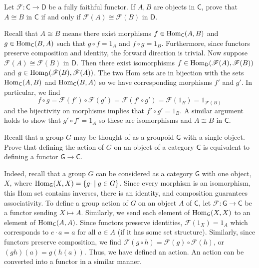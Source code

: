 \documentclass[../../master.tex]{subfiles}
\begin{document}
\begin{problem}
    Let $\mathscr{F} : \mathsf{C} \to \mathsf{D}$ be a fully faithful functor.
    If $A, B$ are objects in $\mathsf{C}$, prove that $A \cong B$ in $\mathsf{C}$ if and only if $\mathscr{F}(A) \cong \mathscr{F}(B)$ in $\mathsf{D}$.
\end{problem}

\begin{solution}
    Recall that $A \cong B$ means there exist morphisms $f \in \operatorname{Hom}_{\mathsf{C}}(A, B)$ and $g \in \operatorname{Hom}_{\mathsf{C}}(B, A)$ such that $g \circ f = 1_A$ and $f \circ g = 1_B$.
    Furthermore, since functors preserve composition and identity, the forward direction is trivial.
    Now suppose $\mathscr{F}(A) \cong \mathscr{F}(B)$ in $\mathsf{D}$.
    Then there exist isomorphisms $f \in \operatorname{Hom}_{\mathsf{D}}(\mathscr{F}(A), \mathscr{F}(B))$ and $g \in \operatorname{Hom}_{\mathsf{D}}(\mathscr{F}(B), \mathscr{F}(A))$.
    The two Hom sets are in bijection with the sets $\operatorname{Hom}_{\mathsf{C}}(A, B)$ and $\operatorname{Hom}_{\mathsf{C}}(B, A)$ so we have corresponding morphisms $f'$ and $g'$.
    In particular, we find
    \[
        f \circ g = \mathscr{F}(f') \circ \mathscr{F}(g') = \mathscr{F}(f' \circ g') = \mathscr{F}(1_B) = 1_{\mathscr{F}(B)}
    \]
    and the bijectivity on morphisms implies that $f' \circ g' = 1_B$.
    A similar argument holds to show that $g' \circ f' = 1_A$ so these are isomorphisms and $A \cong B$ in $\mathsf{C}$.
\end{solution}

\begin{problem}
    Recall that a group $G$ may be thought of as a groupoid $\mathsf{G}$ with a single object.
    Prove that defining the action of $G$ on an object of a category $\mathsf{C}$ is equivalent to defining a functor $\mathsf{G} \to \mathsf{C}$.
\end{problem}

\begin{solution}
    Indeed, recall that a group $G$ can be considered as a category $\mathsf{G}$ with one object, $X$, where $\operatorname{Hom}_{\mathsf{G}}(X, X) = \{g \cdot \mid g \in G\}$.
    Since every morphism is an isomorphism, this Hom set contains inverses, there is an identity, and composition guarantees associativity.
    To define a group action of $G$ on an object $A$ of $\mathsf{C}$, let $\mathscr{F} : \mathsf{G} \to \mathsf{C}$ be a functor sending $X \mapsto A$.
    Similarly, we send each element of $\operatorname{Hom}_{\mathsf{G}}(X, X)$ to an element of $\operatorname{Hom}_{\mathsf{C}}(A, A)$.
    Since functors preserve identities, $\mathscr{F}(1_X) = 1_A$ which corresponds to $e \cdot a = a$ for all $a \in A$ (if it has some set structure).
    Similarly, since functors preserve composition, we find $\mathscr{F}(g \circ h) = \mathscr{F}(g) \circ \mathscr{F}(h)$, or $(gh)(a) = g(h(a))$.
    Thus, we have defined an action.
    An action can be converted into a functor in a similar manner.
\end{solution}
\end{document}

